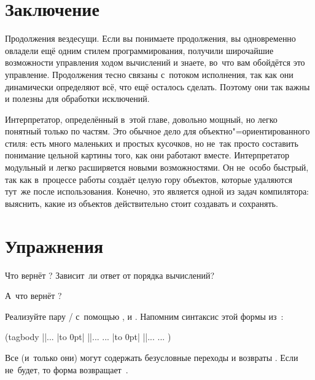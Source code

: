 \section{Заключение}\label{escape/sect:conclusions}

Продолжения вездесущи. Если вы понимаете продолжения, вы одновременно овладели
ещё одним стилем программирования, получили широчайшие возможности управления
ходом вычислений и знаете, во~что вам обойдётся это управление. Продолжения
тесно связаны с~потоком исполнения, так как они динамически определяют всё, что
ещё осталось сделать. Поэтому они так важны и полезны для обработки исключений.

Интерпретатор, определённый в~этой главе, довольно мощный, но легко понятный
только по частям. Это обычное дело для объектно"=ориентированного стиля: есть
много маленьких и простых кусочков, но не~так просто составить понимание цельной
картины того, как они работают вместе. Интерпретатор модульный и легко
расширяется новыми возможностями. Он не~особо быстрый, так как в~процессе работы
создаёт целую гору объектов, которые удаляются тут~же после использования.
Конечно, это является одной из задач компилятора: выяснить, какие из объектов
действительно стоит создавать и сохранять.


\section{Упражнения}\label{escape/sect:exercises}

\begin{exercise}\label{escape/ex:cc-cc}
Что вернёт ? Зависит~ли ответ от порядка вычислений?
\end{exercise}


\begin{exercise}\label{escape/ex:cc-cc-cc-cc}
А~что вернёт ?
\end{exercise}


\begin{exercise}\label{escape/ex:tagbody}
Реализуйте пару / с~помощью ,  и
. Напомним синтаксис этой формы из~{\CommonLisp}:

\begin{code:lisp}
(tagbody
          ||...
  |\hbox to 0pt{}|        ||...
          ...
  |\hbox to 0pt{}|        ||...
          ... )
\end{code:lisp}

Все  (и~только они) могут содержать безусловные переходы
 и возвраты . Если 
не~будет, то форма  возвращает~.
\end{exercise}


